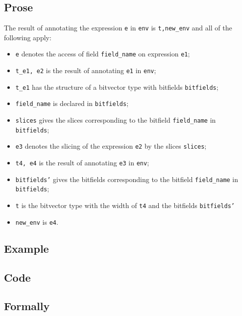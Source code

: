 \documentclass{book}
\begin{document}
  \subsection{Prose}
  The result of annotating the expression \texttt{e} in \texttt{env} is
\texttt{t,new\_env} and all of the following apply:
  \begin{itemize}
  \item \texttt{e} denotes the access of field \texttt{field\_name} on expression \texttt{e1};
  \item \texttt{t\_e1, e2} is the result of annotating \texttt{e1} in \texttt{env};
  \item \texttt{t\_e1} has the structure of a bitvector type with bitfields \texttt{bitfields};
  \item \texttt{field\_name} is declared in \texttt{bitfields};
  \item \texttt{slices} gives the slices corresponding to the bitfield \texttt{field\_name} in
    \texttt{bitfields};
  \item \texttt{e3} denotes the slicing of the expression \texttt{e2} by the slices \texttt{slices};
  \item \texttt{t4, e4} is the result of annotating \texttt{e3} in \texttt{env};
  \item \texttt{bitfields'} gives the bitfields corresponding to the bitfield \texttt{field\_name}
    in \texttt{bitfields};
  \item \texttt{t} is the bitvector type with the width of \texttt{t4} and the bitfields \texttt{bitfields'}
  \item \texttt{new\_env} is \texttt{e4}.
  \end{itemize}

  \subsection{Example}

  \subsection{Code}

\begin{emptyformal}
    \subsection{Formally}
\end{emptyformal}
\end{document}
